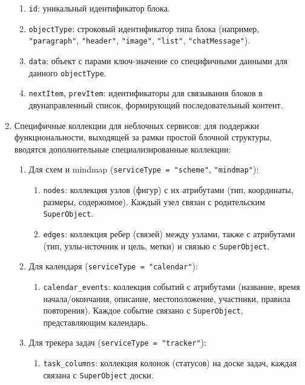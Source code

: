 \begin{enumerate}
\begin{enumerate}
        \item \texttt{id}: уникальный идентификатор блока.
        \item \texttt{objectType}: строковый идентификатор типа блока (например, \texttt{"paragraph"}, \texttt{"header"}, \texttt{"image"}, \texttt{"list"}, \texttt{"chatMessage"}).
        \item \texttt{data}: объект с парами ключ-значение со специфичными данными для данного \texttt{objectType}.
        \item \texttt{nextItem}, \texttt{prevItem}: идентификаторы для связывания блоков в двунаправленный список, формирующий последовательный контент.
    \end{enumerate}

\item Специфичные коллекции для неблочных сервисов: для поддержки функциональности, выходящей за рамки простой блочной структуры, вводятся дополнительные специализированные коллекции:
    \begin{enumerate}
        \item Для схем и mindmap (\texttt{serviceType = "scheme"}, \texttt{"mindmap"}):
            \begin{enumerate}
                \item \texttt{nodes}: коллекция узлов (фигур) с их атрибутами (тип, координаты, размеры, содержимое). Каждый узел связан с родительским \texttt{SuperObject}.
                \item \texttt{edges}: коллекция ребер (связей) между узлами, также с атрибутами (тип, узлы-источник и цель, метки) и связью с \texttt{SuperObject}.
            \end{enumerate}
        \item Для календаря (\texttt{serviceType = "calendar"}):
            \begin{enumerate}
                \item \texttt{calendar\_events}: коллекция событий с атрибутами (название, время начала/окончания, описание, местоположение, участники, правила повторения). Каждое событие связано с \texttt{SuperObject}, представляющим календарь.
            \end{enumerate}
        \item Для трекера задач (\texttt{serviceType = "tracker"}):
            \begin{enumerate}
                \item \texttt{task\_columns}: коллекция колонок (статусов) на доске задач, каждая связана с \texttt{SuperObject} доски.

\end{enumerate}
\end{enumerate}
\end{enumerate}
